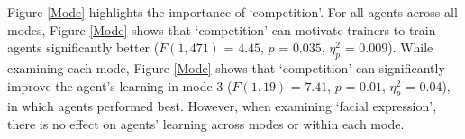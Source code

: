 \documentclass[10pt,journal,compsoc]{IEEEtran}
\begin{document}
Figure \ref{Mode} highlights the importance of `competition'. %
For all agents across all modes, Figure \ref{Mode} shows that `competition' can motivate trainers to train agents  significantly better ($F(1,471)$ = $4.45$, $p$ = $0.035$, $\eta_{p}^{2}$ = $0.009$). %
While examining %
each mode, %
Figure \ref{Mode} shows that `competition' can significantly improve the agent's learning in %
mode 3 ($F(1,19)$ = $7.41$, $p$ = $0.01$, $\eta_{p}^{2}$ = $0.04$),  %
in which agents performed best. However, when examining `facial expression', there is no effect on agents' learning across modes or within each mode.
\end{document}
